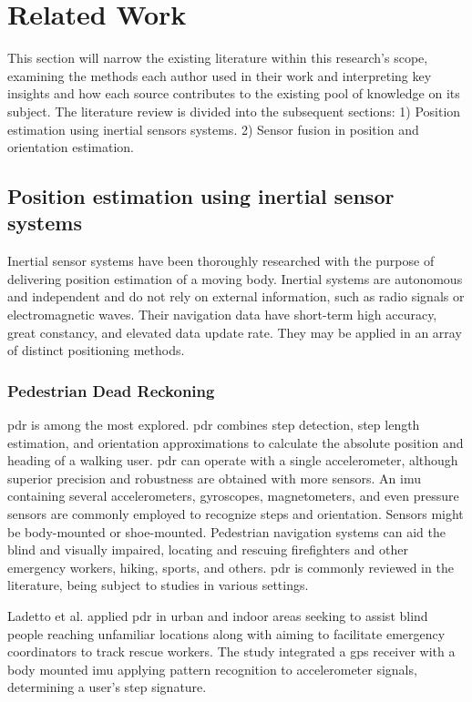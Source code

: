 \section{Related Work}

This section will narrow the existing literature within this research's scope, examining the methods each author used in their work and interpreting key insights and how each source contributes to the existing pool of knowledge on its subject. The literature review is divided into the subsequent sections: 1) Position estimation using inertial sensors systems. 2) Sensor fusion in position and orientation estimation.

\subsection{Position estimation using inertial sensor systems}

Inertial sensor systems have been thoroughly researched with the purpose of delivering position estimation of a moving body. Inertial systems are autonomous and independent and do not rely on external information, such as radio signals or electromagnetic waves. Their navigation data have short-term high accuracy, great constancy, and elevated data update rate. They may be applied in an array of distinct positioning methods.

\subsubsection{Pedestrian Dead Reckoning}

\acrfull{pdr} is among the most explored. \acrshort{pdr} combines step detection, step length estimation, and orientation approximations to calculate the absolute position and heading of a walking user. \acrshort{pdr} can operate with a single accelerometer, although superior precision and robustness are obtained with more sensors. An \acrshort{imu} containing several accelerometers, gyroscopes, magnetometers, and even pressure sensors are commonly employed to recognize steps and orientation. Sensors might be body-mounted or shoe-mounted. Pedestrian navigation systems can aid the blind and visually impaired, locating and rescuing firefighters and other emergency workers, hiking, sports, and others. \acrshort{pdr} is commonly reviewed in the literature, being subject to studies in various settings.

Ladetto et al. \cite{ladetto2002step} applied \acrshort{pdr} in urban and indoor areas seeking to assist blind people reaching unfamiliar locations along with aiming to facilitate emergency coordinators to track rescue workers. The study integrated a \acrshort{gps} receiver with a body mounted \acrshort{imu} applying pattern recognition to accelerometer signals, determining a user's step signature.

